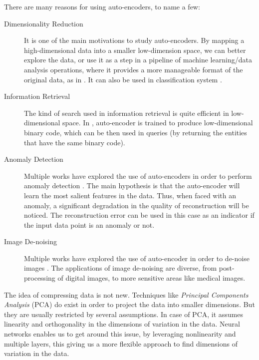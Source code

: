   \par There are many reasons for using auto-encoders, to name a few:
  \begin{description}
    \item [Dimensionality Reduction] It is one of the main motivations to study auto-encoders. By mapping a high-dimensional data into a smaller low-dimension space, we can better explore the data, or use it as a step in a pipeline of machine learning/data analysis operations, where it provides a more manageable format of the original data, as in \citep{ha2018world}. It can also be used in classification system \citep{Goodfellow-et-al-2016}.

    \item [Information Retrieval] The kind of search used in information retrieval is quite efficient in low-dimensional space. In \citep{salakhutdinov2009semantic}, auto-encoder is trained to produce low-dimensional binary code, which can be then used in queries (by returning the entities that have the same binary code).

    \item [Anomaly Detection] Multiple works have explored the use of auto-encoders in order to perform anomaly detection \citep{sakurada2014anomaly,an2015variational,ribeiro2018study}. The main hypothesis is that the auto-encoder will learn the most salient features in the data. Thus, when faced with an anomaly, a significant degradation in the quality of reconstruction will be noticed. The reconstruction error can be used in this case as an indicator if the input data point is an anomaly or not.

    \item [Image De-noising] Multiple works have explored the use of auto-encoder in order to de-noise images \citep{cho2013boltzmann,cho2013simple,gondara2016medical}. The applications of image de-noising are diverse, from post-processing of digital images, to more sensitive areas like medical images.

  \end{description}

  \par The idea of compressing data is not new. Techniques like \textit{Principal Components Analysis} (PCA) \citep{jolliffe2011principal} do exist in order to project the data into smaller dimensions. But they are usually restricted by several assumptions. In case of PCA, it assumes linearity and orthogonality in the dimensions of variation in the data. Neural networks enables us to get around this issue, by leveraging nonlinearity and multiple layers, this giving us a more flexible approach to find dimensions of variation in the data.

